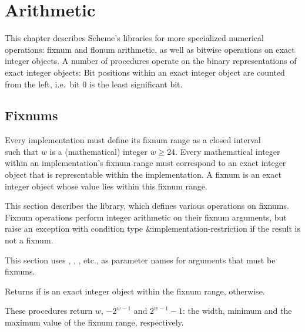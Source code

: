\chapter{Arithmetic}
\label{numberchapter}

This chapter describes Scheme's libraries for more specialized
numerical operations: fixnum and flonum arithmetic, as well as bitwise
operations on exact integer objects.  A number of procedures operate
on the binary representations of exact integer objects: Bit positions
within an exact integer object are counted from the left, i.e.\ bit 0
is the least significant bit.

\section{Fixnums}
\label{fixnumssection}

Every implementation must define its fixnum range as a closed
interval
%
\begin{displaymath}
[-2^{w-1}, 2^{w-1} - 1]
\end{displaymath}
%
such that $w$ is a (mathematical) integer $w \geq 24$.  Every
mathematical integer within an implementation's fixnum range must
correspond to an exact integer object that is representable within the
implementation.
A fixnum is an exact integer object whose value lies within this
fixnum range.

This section describes the  library,
which defines various operations on fixnums.
Fixnum operations perform integer arithmetic on their fixnum
arguments, but raise an exception with condition type
{\cf\&implementation-restriction} if the result is not a fixnum.

This section uses , , , etc., as parameter
names for arguments that must be fixnums.

\begin{entry}{%
}

Returns \schtrue{} if  is an exact
integer object within the fixnum range, \schfalse{} otherwise.
\end{entry}

\begin{entry}{%
}

These procedures return $w$,
$-2^{w-1}$ and $2^{w-1} - 1$: the
width, minimum and the maximum value of the fixnum range, respectively.
\end{entry}

